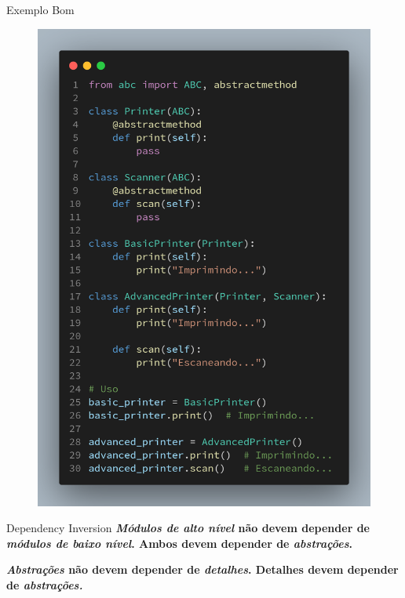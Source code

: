 \documentclass{libs/ufc_format}
\begin{document}
\begin{frame}{Exemplo \textcolor{ggreen}{Bom}}
    \begin{figure}
        \centering
        \includegraphics[scale=0.12]{images/i_exemple_good.png}
    \end{figure}
\end{frame}

\begin{frame}{Dependency Inversion}
    \centering
    \textbf{\emph{Módulos de alto nível} não devem depender de \emph{módulos de
    baixo nível}. Ambos devem depender de \emph{abstrações}.}

    \vspace{20px}

    \textbf{\emph{Abstrações} não devem depender de \emph{detalhes}. Detalhes
    devem depender de \emph{abstrações.}}
\end{frame}
\end{document}
